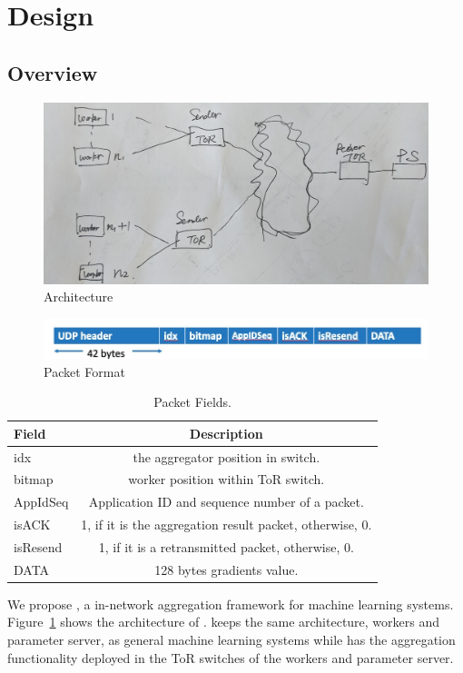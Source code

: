 \section{Design}
\subsection{Overview}
\begin{figure}
    \centering
    \includegraphics[width=1.0\linewidth]{figures/p4ml-arch.jpg}
    \caption{\system Architecture}
    \label{fig:p4ml-arch}
\end{figure}
\begin{figure}
    \centering
    \includegraphics[width=1.0\linewidth]{figures/pktformat.jpeg}
    \caption{\system Packet Format}
    \label{fig:packet-format}
\end{figure}
\begin{table}[h!]
  \begin{center}
    \caption{Packet Fields.}
    \label{tab:packet-field}
    \begin{tabular}{|l|c|} 
	\hline
		\textbf{Field} & \textbf{Description} \\
      \hline
      idx & the aggregator position in switch.\\
      \hline
		bitmap & worker position within ToR switch. \\
      \hline
		AppIdSeq & Application ID and sequence number of a packet.\\
	  \hline
		isACK & 1, if it is the aggregation result packet, otherwise, 0. \\
		\hline
		isResend & 1, if it is a retransmitted packet, otherwise, 0. \\
		\hline 
		DATA &  128 bytes gradients value. \\
		\hline 
    \end{tabular}
  \end{center}
\end{table}
We propose \system, a in-network aggregation framework for machine learning systems.
Figure~\ref{fig:p4ml-arch} shows the architecture of \system. 
\system keeps the same architecture, workers and parameter server, as general machine learning systems
while has the aggregation functionality deployed in the ToR switches of the workers and parameter server.

